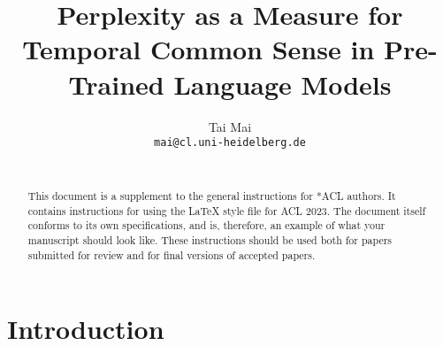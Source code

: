 \documentclass[11pt]{article}
\title{Perplexity as a Measure for Temporal Common Sense in Pre-Trained Language Models}
\author{Tai Mai \\
  \texttt{mai@cl.uni-heidelberg.de} \\
  \\}
\begin{document}
\maketitle
\begin{abstract}
This document is a supplement to the general instructions for *ACL authors. It contains instructions for using the \LaTeX{} style file for ACL 2023.
The document itself conforms to its own specifications, and is, therefore, an example of what your manuscript should look like.
These instructions should be used both for papers submitted for review and for final versions of accepted papers.
\end{abstract}

\section{Introduction}
\end{document}
